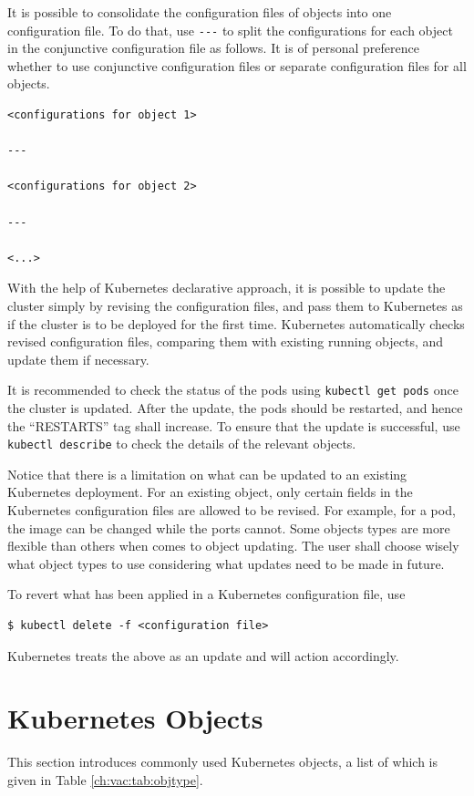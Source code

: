 It is possible to consolidate the configuration files of objects into one configuration file. To do that, use \verb|---| to split the configurations for each object in the conjunctive configuration file as follows. It is of personal preference whether to use conjunctive configuration files or separate configuration files for all objects.
\begin{lstlisting}
<configurations for object 1>

---

<configurations for object 2>

---

<...>
\end{lstlisting}

With the help of Kubernetes declarative approach, it is possible to update the cluster simply by revising the configuration files, and pass them to Kubernetes as if the cluster is to be deployed for the first time. Kubernetes automatically checks revised configuration files, comparing them with existing running objects, and update them if necessary.

It is recommended to check the status of the pods using \verb|kubectl get pods| once the cluster is updated. After the update, the pods should be restarted, and hence the ``RESTARTS'' tag shall increase. To ensure that the update is successful, use \verb|kubectl describe| to check the details of the relevant objects.

Notice that there is a limitation on what can be updated to an existing Kubernetes deployment. For an existing object, only certain fields in the Kubernetes configuration files are allowed to be revised. For example, for a pod, the image can be changed while the ports cannot. Some objects types are more flexible than others when comes to object updating. The user shall choose wisely what object types to use considering what updates need to be made in future.

To revert what has been applied in a Kubernetes configuration file, use
\begin{lstlisting}
$ kubectl delete -f <configuration file>
\end{lstlisting}
Kubernetes treats the above as an update and will action accordingly.

\section{Kubernetes Objects} \label{ch:vac:sec:objects}

This section introduces commonly used Kubernetes objects, a list of which is given in Table \ref{ch:vac:tab:objtype}.

